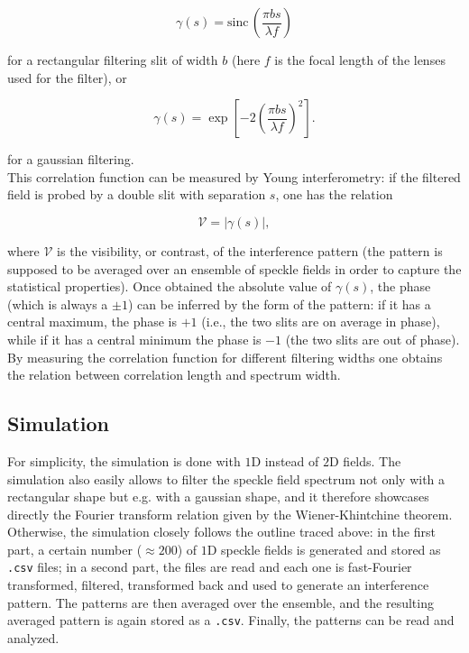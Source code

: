 \begin{equation} \label{rect-corr}
    \gamma(s) = \mathrm{sinc}\,\left( \frac{\pi bs}{\lambda f} \right)
\end{equation}

for a rectangular filtering slit of width $b$ (here $f$ is the focal length of the lenses used for the filter), or 

\begin{equation} \label{gauss-corr}
    \gamma(s) = \exp\left[-2\left(\frac{\pi bs}{\lambda f}\right)^2\right].
\end{equation}

for a gaussian filtering. \\

This correlation function can be measured by Young interferometry: if the filtered field is probed by a double slit with separation $s$, one has the relation 

\begin{equation}
    \mathcal V = |\gamma(s)|,
\end{equation}

where $\mathcal V$ is the visibility, or contrast, of the interference pattern (the pattern is supposed to be averaged over an ensemble of speckle fields 
in order to capture the statistical properties). Once obtained the absolute value of $\gamma(s)$, the phase (which is always a $\pm 1$) can be inferred by the form of the 
pattern: if it has a central maximum, the phase is $+1$ (i.e., the two slits are on average in phase), while if it has a central minimum the phase is $-1$ 
(the two slits are out of phase). \\

By measuring the correlation function for different filtering widths one obtains the relation between correlation length and spectrum width.

\subsection{Simulation}

For simplicity, the simulation is done with $1$D instead of $2$D fields. The simulation also easily allows to filter the speckle field spectrum not only with 
a rectangular shape but e.g. with a gaussian shape, and it therefore showcases directly the Fourier transform relation given by the Wiener-Khintchine theorem. \\

Otherwise, the simulation closely follows the outline traced above: in the first part, a certain number ($\approx 200$) of $1$D speckle fields is generated 
and stored as \texttt{.csv} files; in a second part, the  files are read and each one is fast-Fourier transformed, filtered, transformed back and used to generate an 
interference pattern. The patterns are then averaged over the ensemble, and the resulting averaged pattern is again stored as a \texttt{.csv}. Finally, the patterns can 
be read and analyzed. \\

